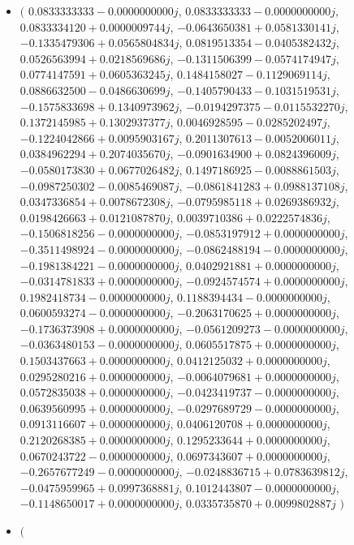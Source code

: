 \documentclass[14pt,a4paper]{article}
\begin{document}
\begin{itemize}
\item
$\big($
$0.0833333333-0.0000000000j$, $0.0833333333-0.0000000000j$, $0.0833334120+0.0000009744j$, $-0.0643650381+0.0581330141j$, $-0.1335479306+0.0565804834j$, $0.0819513354-0.0405382432j$, $0.0526563994+0.0218569686j$, $-0.1311506399-0.0574174947j$, $0.0774147591+0.0605363245j$, $0.1484158027-0.1129069114j$, $0.0886632500-0.0486630699j$, $-0.1405790433-0.1031519531j$, $-0.1575833698+0.1340973962j$, $-0.0194297375-0.0115532270j$, $0.1372145985+0.1302937377j$, $0.0046928595-0.0285202497j$, $-0.1224042866+0.0095903167j$, $0.2011307613-0.0052006011j$, $0.0384962294+0.2074035670j$, $-0.0901634900+0.0824396009j$, $-0.0580173830+0.0677026482j$, $0.1497186925-0.0088861503j$, $-0.0987250302-0.0085469087j$, $-0.0861841283+0.0988137108j$, $0.0347336854+0.0078672308j$, $-0.0795985118+0.0269386932j$, $0.0198426663+0.0121087870j$, $0.0039710386+0.0222574836j$, $-0.1506818256-0.0000000000j$, $-0.0853197912+0.0000000000j$, $-0.3511498924-0.0000000000j$, $-0.0862488194-0.0000000000j$, $-0.1981384221-0.0000000000j$, $0.0402921881+0.0000000000j$, $-0.0314781833+0.0000000000j$, $-0.0924574574+0.0000000000j$, $0.1982418734-0.0000000000j$, $0.1188394434-0.0000000000j$, $0.0600593274-0.0000000000j$, $-0.2063170625+0.0000000000j$, $-0.1736373908+0.0000000000j$, $-0.0561209273-0.0000000000j$, $-0.0363480153-0.0000000000j$, $0.0605517875+0.0000000000j$, $0.1503437663+0.0000000000j$, $0.0412125032+0.0000000000j$, $0.0295280216+0.0000000000j$, $-0.0064079681+0.0000000000j$, $0.0572835038+0.0000000000j$, $-0.0423419737-0.0000000000j$, $0.0639560995+0.0000000000j$, $-0.0297689729-0.0000000000j$, $0.0913116607+0.0000000000j$, $0.0406120708+0.0000000000j$, $0.2120268385+0.0000000000j$, $0.1295233644+0.0000000000j$, $0.0670243722-0.0000000000j$, $0.0697343607+0.0000000000j$, $-0.2657677249-0.0000000000j$, $-0.0248836715+0.0783639812j$, $-0.0475959965+0.0997368881j$, $0.1012443807-0.0000000000j$, $-0.1148650017+0.0000000000j$, $0.0335735870+0.0099802887j$
$\big)$
\item
$\big($

\end{itemize}
\end{document}
